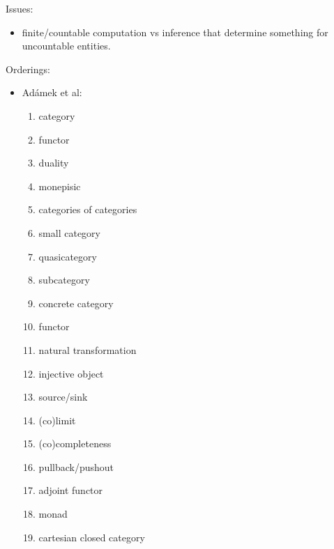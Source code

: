 \documentclass[11pt,openany]{book}
\begin{document}
Issues: 
\begin{itemize}
  \item finite/countable computation vs inference that determine
something for uncountable entities.
  \end{itemize}

\setcounter{currentlevel}{\value{baseSectionLevel}}
\label{sec:Key-ideas}

Orderings:
\begin{itemize}
 
\item Ad\'{a}mek et al:~\cite{AdamekHerrlichStrecker:1990}
\begin{enumerate}
  \item category 
  \item functor
  \item duality
  \item monepisic
  \item categories of categories 
  \item small category
  \item quasicategory
  \item subcategory
  \item concrete category
  \item functor
  \item natural transformation
  \item injective object
  \item source/sink
  \item (co)limit
  \item (co)completeness
  \item pullback/pushout
  \item adjoint functor
  \item monad
  \item cartesian closed category
\end{enumerate}


\end{itemize}
\end{document}
